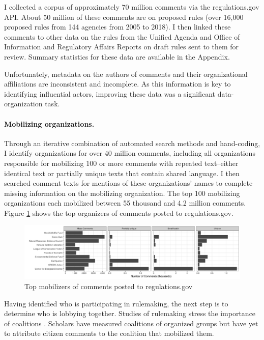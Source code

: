 \documentclass[
      12pt,
        ]{article}
\begin{document}
I collected a corpus of approximately 70 million comments via the
regulations.gov API. About 50 million of these comments are on proposed
rules (over 16,000 proposed rules from 144 agencies from 2005 to 2018).
I then linked these comments to other data on the rules from the Unified
Agenda and Office of Information and Regulatory Affairs Reports on draft
rules sent to them for review. Summary statistics for these data are
available in the Appendix.

Unfortunately, metadata on the authors of comments and their
organizational affiliations are inconsistent and incomplete. As this
information is key to identifying influential actors, improving these
data was a significant data-organization task.

\hypertarget{mobilizing-organizations.}{%
\paragraph{Mobilizing organizations.}\label{mobilizing-organizations.}}

Through an iterative combination of automated search methods and hand-coding, I identify organizations for over 40 million comments, including all organizations responsible for mobilizing 100 or more
comments with repeated text--either identical text or partially unique
texts that contain shared language. I then searched comment texts for
mentions of these organizations' names to complete missing information
on the mobilizing organization. The top 100 mobilizing organizations
each mobilized between 55 thousand and 4.2 million comments. Figure
\ref{fig:toporgs} shows the top organizers of comments posted to
regulations.gov.

\begin{figure}

{\centering \includegraphics[width=6.5in]{../Figs/toporgs} 

}

\caption{Top mobilizers of comments posted to regulations.gov}\label{fig:toporgs}
\end{figure}

Having identified who is participating in rulemaking, the next step is
to determine who is lobbying together. Studies of rulemaking stress the importance of coalitions \citep[Dwidar2019]{Yackee2006JOP}. Scholars have measured coalitions of organized groups but have yet to attribute citizen comments to the coalition that mobilized them.
\end{document}
